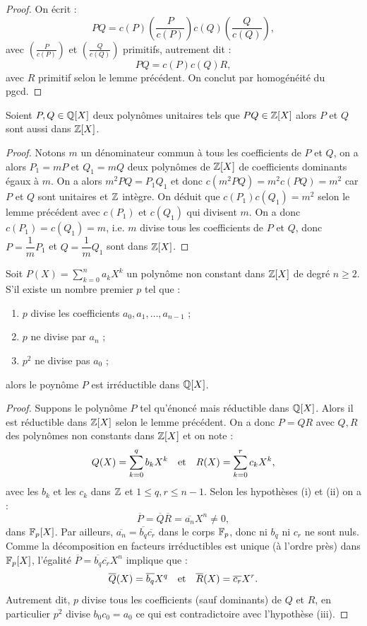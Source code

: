 \begin{proof}
On écrit :
\[ PQ = c(P) \left ( \frac{P}{c(P)} \right ) c(Q) \left ( \frac{Q}{c(Q)} \right ) , \]
avec $\left ( \frac{P}{c(P)} \right )$ et $\left ( \frac{Q}{c(Q)} \right )$ primitifs, autrement dit :
\[ PQ = c(P) c(Q) R , \]
avec $R$ primitif selon le lemme précédent. On conclut par homogénéité du pgcd.
\end{proof}

\begin{lem}
\label{lem:3}
Soient $P, Q \in \mathbb{Q}[X]$ deux polynômes unitaires tels que $PQ \in \mathbb{Z}[X]$ alors $P$ et $Q$ sont aussi dans $\mathbb{Z}[X]$.
\end{lem}

\begin{proof}
Notons $m$ un dénominateur commun à tous les coefficients de $P$ et $Q$, on a alors $P_1=mP$ et $Q_1=mQ$ deux polynômes 
de $\mathbb{Z}[X]$ de coefficients dominants égaux à $m$.
On a alors $m^2 PQ = P_1 Q_1$ et donc $c(m^2 PQ)= m^2 c(PQ) = m^2$ car $P$ et $Q$ sont unitaires et $\mathbb{Z}$ intègre.
On déduit que $c(P_1)c(Q_1) = m^2$ selon le lemme précédent avec $c(P_1)$ et $c(Q_1)$ qui divisent $m$.
On a donc $c(P_1)=c(Q_1)=m$, i.e. $m$ divise tous les coefficients de $P$ et $Q$, 
donc $P=\dfrac1{m} P_1$ et $Q=\dfrac1{m} Q_1$ sont dans $\mathbb{Z}[X]$.
\end{proof}

\begin{thm}
Soit $P(X) = \sum_{k=0}^n a_k X^k$ un polynôme non constant dans $\mathbb{Z}[X]$ de degré $n \geq 2$. 
S'il existe un nombre premier $p$ tel que :
\begin{enumerate}[label=(\roman*)]
\item $p$ divise les coefficients $a_0, a_1, \dots, a_{n-1}$ ;
\item $p$ ne divise par $a_n$ ;
\item $p^2$ ne divise pas $a_0$ ;
\end{enumerate}
alors le poynôme $P$ est irréductible dans $\mathbb{Q}[X]$.
\end{thm}

\begin{proof}
Suppons le polynôme $P$ tel qu'énoncé mais réductible dans $\mathbb{Q}[X]$. Alors il est réductible dans $\mathbb{Z}[X]$ selon le lemme précédent.
On a donc $P=QR$ avec $Q, R$ des polynômes non constants dans $\mathbb{Z}[X]$ et on note :
\[ Q(X) = \sum_{k=0}^q b_k X^k \quad \text{et} \quad R(X) = \sum_{k=0}^r c_k X^k , \]
avec les $b_k$ et les $c_k$ dans $\mathbb{Z}$ et $1 \leq q, r \leq n-1$.
Selon les hypothèses (i) et (ii) on a :
\[ \overline{P} = \overline{Q} \overline{R} = \overline {a_n} X^n \neq 0 , \]
dans $\mathbb{F}_p[X]$. Par ailleurs, $\overline{a_n} = \overline{b_q} \overline{c_r}$ dans le corps $\mathbb{F}_p$, donc ni $b_q$ ni $c_r$ ne sont nuls.
Comme la décomposition en facteurs irréductibles est unique (à l'ordre près) dans $\mathbb{F}_p[X]$, 
l'égalité $\overline{P} = \overline{b_q} \overline{c_r} X^n$ implique que :
\[ \overline{Q}(X) = \overline{b_q} X^q \quad \text{et} \quad \overline{R}(X) = \overline{c_r} X^r . \]
Autrement dit, $p$ divise tous les coefficients (sauf dominants) de $Q$ et $R$, 
en particulier $p^2$ divise $b_0 c_0 = a_0$ ce qui est contradictoire avec l'hypothèse (iii).
\end{proof}

